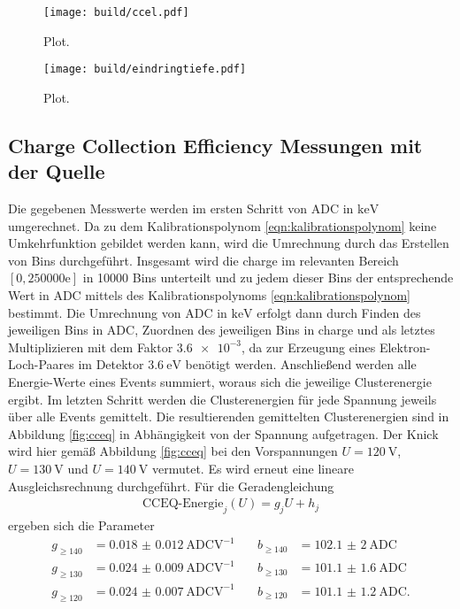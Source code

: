 \begin{figure}
  \centering
  \texttt{[image: build/ccel.pdf]}
  \caption{Plot.}
  \label{fig:ccel}
\end{figure}

\begin{figure}
  \centering
  \texttt{[image: build/eindringtiefe.pdf]}
  \caption{Plot.}
  \label{fig:eindringtiefe}
\end{figure}

\subsection{Charge Collection Efficiency Messungen mit der Quelle}
\label{sec:cceq}

Die gegebenen Messwerte werden im ersten Schritt von ADC in $\si{\kilo\electronvolt}$ umgerechnet.
Da zu dem Kalibrationspolynom \eqref{eqn:kalibrationspolynom} keine Umkehrfunktion gebildet werden kann,
wird die Umrechnung durch das Erstellen von Bins durchgeführt. Insgesamt wird die charge im relevanten Bereich
$[0,250000\mathrm{e}]$ in 10000 Bins unterteilt und zu jedem dieser Bins der entsprechende Wert in ADC mittels
des Kalibrationspolynoms \eqref{eqn:kalibrationspolynom} bestimmt. Die Umrechnung von ADC in $\si{\kilo\electronvolt}$
erfolgt dann durch Finden des jeweiligen Bins in ADC, Zuordnen des jeweiligen Bins in charge und als letztes Multiplizieren
mit dem Faktor $\num{3.6e-3}$, da zur Erzeugung eines Elektron-Loch-Paares im Detektor $\SI{3.6}{\electronvolt}$
benötigt werden. Anschließend werden alle Energie-Werte eines Events summiert, woraus sich die jeweilige Clusterenergie ergibt.
Im letzten Schritt werden die Clusterenergien für jede Spannung jeweils über alle Events gemittelt. Die resultierenden
gemittelten Clusterenergien sind in Abbildung \ref{fig:cceq} in Abhängigkeit von der Spannung aufgetragen.
Der Knick wird hier gemäß Abbildung \ref{fig:cceq} bei den Vorspannungen $U = \SI{120}{\volt}$, $U = \SI{130}{\volt}$ und
$U = \SI{140}{\volt}$ vermutet. Es wird erneut eine lineare Ausgleichsrechnung durchgeführt.
Für die Geradengleichung
\begin{align}
  \text{CCEQ-Energie}_j(U) = g_j U + h_j
\end{align}
ergeben sich die Parameter
\begin{align*}
  g_{\geq140} &= \SI{0.018(12)}{\text{ADC}\volt\tothe{-1}} &\quad b_{\geq140} &= \SI{102.1(20)}{\text{ADC}} \\
  g_{\geq130} &=  \SI{0.024(9)}{\text{ADC}\volt\tothe{-1}} &\quad b_{\geq130} &= \SI{101.1(16)}{\text{ADC}} \\
  g_{\geq120} &=  \SI{0.024(7)}{\text{ADC}\volt\tothe{-1}} &\quad b_{\geq120} &= \SI{101.1(12)}{\text{ADC}}.
\end{align*}
